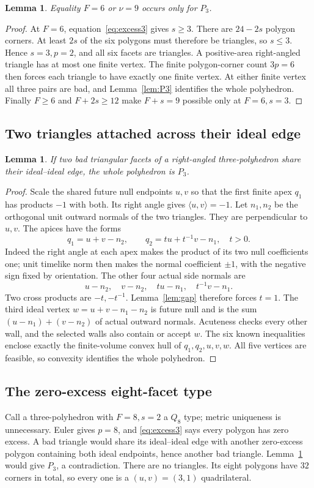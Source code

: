 \documentclass[11pt]{article}
\newtheorem{lemma}[theorem]{Lemma}
\newcommand{\ip}[2]{\langle #1,#2\rangle}
\newcommand{\Pthree}{P_3}
\newcommand{\Qeight}{Q_8}
\begin{document}
\begin{lemma}\label{lem:six}
Equality $F=6$ or $\nu=9$ occurs only for $\Pthree$.
\end{lemma}
\begin{proof}
At $F=6$, equation~\eqref{eq:excess3} gives $s\ge3$. There are
$24-2s$ polygon corners. At least $2s$ of the six polygons must
therefore be triangles, so $s\le3$. Hence $s=3,p=2$, and all
six facets are triangles. A positive-area right-angled triangle
has at most one finite vertex. The finite polygon-corner count
$3p=6$ then forces each triangle to have exactly one finite
vertex. At either finite vertex all three pairs are bad, and
Lemma~\ref{lem:P3} identifies the whole polyhedron. Finally
$F\ge6$ and $F+2s\ge12$ make $F+s=9$ possible only at
$F=6,s=3$.
\end{proof}

\subsection{Two triangles attached across their ideal edge}
\begin{lemma}\label{lem:attachment}
If two bad triangular facets of a right-angled three-polyhedron
share their ideal--ideal edge, the whole polyhedron is $\Pthree$.
\end{lemma}
\begin{proof}
Scale the shared future null endpoints $u,v$ so that the first
finite apex $q_1$ has products $-1$ with both. Its right angle
gives $\ip{u}{v}=-1$. Let $n_1,n_2$ be the orthogonal unit
outward normals of the two triangles. They are perpendicular to
$u,v$. The apices have the forms
\[
 q_1=u+v-n_2,\qquad q_2=t u+t^{-1}v-n_1,\quad t>0.
\]
Indeed the right angle at each apex makes the product of its two
null coefficients one; unit timelike norm then makes the normal
coefficient $\pm1$, with the negative sign fixed by orientation.
The other four actual side normals are
\[
 u-n_2,\quad v-n_2,\quad t u-n_1,\quad t^{-1}v-n_1.
\]
Two cross products are $-t,-t^{-1}$. Lemma~\ref{lem:gap}
therefore forces $t=1$. The third ideal vertex
$w=u+v-n_1-n_2$ is future null and is the sum
$(u-n_1)+(v-n_2)$ of actual outward normals. Acuteness checks
every other wall, and the selected walls also contain or accept
$w$. The six known inequalities enclose exactly the finite-volume
convex hull of $q_1,q_2,u,v,w$. All five vertices are feasible,
so convexity identifies the whole polyhedron.
\end{proof}

\subsection{The zero-excess eight-facet type}
Call a three-polyhedron with $F=8,s=2$ a $\Qeight$ type;
metric uniqueness is unnecessary. Euler gives $p=8$, and
\eqref{eq:excess3} says every polygon has zero excess. A bad
triangle would share its ideal--ideal edge with another zero-excess
polygon containing both ideal endpoints, hence another bad
triangle. Lemma~\ref{lem:attachment} would give $\Pthree$,
a contradiction. There are no triangles. Its eight polygons
have $32$ corners in total, so every one is a $(u,v)=(3,1)$
quadrilateral.
\end{document}
